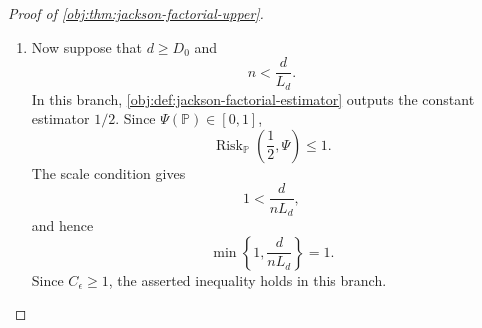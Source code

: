 \documentclass[11pt]{article}
\begin{document}
\begin{proof}[Proof of \cref{obj:thm:jackson-factorial-upper}]
\begin{enumerate}
\(u=(n-2)\epsilon/2\), and the condition \(n\ge4\) give
\[
\Lambda_{n,x}\le \frac{4}{n\epsilon}.
\]
Using \(p_x\le1\) and \(n^{-2}\le n^{-1}\), we obtain
\[
E_{\mathbb P}\delta_{a,x}^2
\le
4E_{\mathbb P}\{(\delta^{\mathrm{res}}_{a,x})^2\}
+
2E_{\mathbb P}\{(\delta^{\mathrm{cell}}_{a,x})^2\}
+
4E_{\mathbb P}\{(\delta^{\mathrm{zero}}_{a,x})^2\}
\le
\frac{100\Xi_\epsilon}{n}.
\]
Moreover,
\[
\widehat V_{n,2}^{\mathrm{ER}}
=
\sum_{x=1}^2 \max\{\zeta_{0,x},\zeta_{1,x}\},
\qquad
\Psi(\mathbb P)
=
\sum_{x=1}^2 \max\{\zeta^0_{0,x},\zeta^0_{1,x}\}.
\]
The maximum map is one-Lipschitz in the sup norm, and Cauchy--Schwarz over the
four pairs \((a,x)\) yields
\[
\left(
\widehat V_{n,2}^{\mathrm{ER}}-\Psi(\mathbb P)
\right)^2
\le
4\sum_{x=1}^2\sum_{a\in\{0,1\}}\delta_{a,x}^2 .
\]
Therefore
\[
\operatorname{Risk}_{\mathbb P}
(\widehat V_{n,2}^{\mathrm{ER}},\Psi)
\le
\frac{1600\Xi_\epsilon}{n}.
\]
Since \(n\ge4\), \(L_2\ge1\), and \(L_2\le2\),
\[
\min\left\{1,\frac{2}{nL_2}\right\}
=
\frac{2}{nL_2},
\qquad
\frac{1600\Xi_\epsilon}{n}
\le
C_\epsilon\frac{2}{nL_2}.
\]

If \(n\le3\), the empirical ratios lie in \([0,1]\), their weights sum to
one, and therefore
\[
0\le \widehat V_{n,2}^{\mathrm{ER}}\le1.
\]
Together with \(0\le\Psi(\mathbb P)\le1\), this gives
\[
\operatorname{Risk}_{\mathbb P}
(\widehat V_{n,2}^{\mathrm{ER}},\Psi)
\le1 .
\]
Also
\[
\frac13\le \frac{2}{nL_2},
\qquad
\frac13\le1,
\]
so
\[
\frac13\le
\min\left\{1,\frac{2}{nL_2}\right\}.
\]
Since \(C_\epsilon\ge3\), the desired bound follows throughout the
bounded-alphabet branch.

\item Now suppose that \(d\ge D_0\) and
\[
n<\frac{d}{L_d}.
\]
In this branch, \cref{obj:def:jackson-factorial-estimator} outputs the constant
estimator \(1/2\).  Since \(\Psi(\mathbb P)\in[0,1]\),
\[
\operatorname{Risk}_{\mathbb P}\left(\frac12,\Psi\right)\le1 .
\]
The scale condition gives
\[
1<\frac{d}{nL_d},
\]
and hence
\[
\min\left\{1,\frac{d}{nL_d}\right\}=1 .
\]
Since \(C_\epsilon\ge1\), the asserted inequality holds in this branch.


\end{enumerate}
\end{proof}
\end{document}
